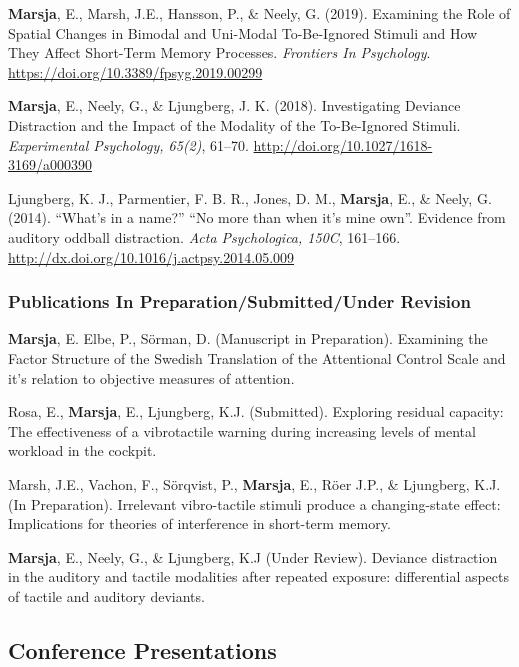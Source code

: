 \documentclass[]{article}
\begin{document}
\textbf{Marsja}, E., Marsh, J.E., Hansson, P., \& Neely, G. (2019).
Examining the Role of Spatial Changes in Bimodal and Uni-Modal
To-Be-Ignored Stimuli and How They Affect Short-Term Memory Processes.
\emph{Frontiers In Psychology}.
\url{https://doi.org/10.3389/fpsyg.2019.00299}

\textbf{Marsja}, E., Neely, G., \& Ljungberg, J. K. (2018).
Investigating Deviance Distraction and the Impact of the Modality of the
To-Be-Ignored Stimuli. \emph{Experimental Psychology, 65(2)}, 61--70.
\url{http://doi.org/10.1027/1618-3169/a000390}

Ljungberg, K. J., Parmentier, F. B. R., Jones, D. M., \textbf{Marsja},
E., \& Neely, G. (2014). ``What's in a name?'' ``No more than when it's
mine own''. Evidence from auditory oddball distraction. \emph{Acta
Psychologica, 150C}, 161--166.
\url{http://dx.doi.org/10.1016/j.actpsy.2014.05.009}

\hypertarget{publications-in-preparationsubmittedunder-revision}{%
\subsubsection{Publications In Preparation/Submitted/Under
Revision}\label{publications-in-preparationsubmittedunder-revision}}

\textbf{Marsja}, E. Elbe, P., Sörman, D. (Manuscript in Preparation).
Examining the Factor Structure of the Swedish Translation of the
Attentional Control Scale and it's relation to objective measures of
attention.

Rosa, E., \textbf{Marsja}, E., Ljungberg, K.J. (Submitted). Exploring
residual capacity: The effectiveness of a vibrotactile warning during
increasing levels of mental workload in the cockpit.

Marsh, J.E., Vachon, F., Sörqvist, P., \textbf{Marsja}, E., Röer J.P.,
\& Ljungberg, K.J. (In Preparation). Irrelevant vibro-tactile stimuli
produce a changing-state effect: Implications for theories of
interference in short-term memory.

\textbf{Marsja}, E., Neely, G., \& Ljungberg, K.J (Under Review).
Deviance distraction in the auditory and tactile modalities after
repeated exposure: differential aspects of tactile and auditory
deviants.

\hypertarget{conference-presentations}{%
\subsection{Conference Presentations}\label{conference-presentations}}
\end{document}
